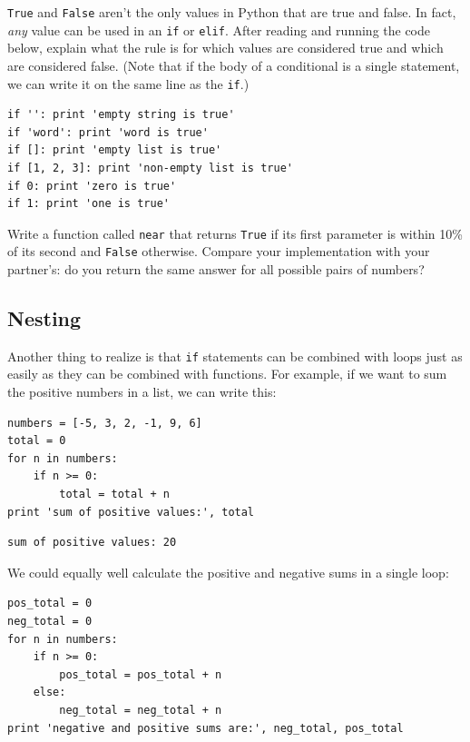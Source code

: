 \documentclass{book}
\begin{document}
\begin{swcenumerate}
\item
  \texttt{True} and \texttt{False} aren't the only values in Python that
  are true and false. In fact, \emph{any} value can be used in an
  \texttt{if} or \texttt{elif}. After reading and running the code
  below, explain what the rule is for which values are considered true
  and which are considered false. (Note that if the body of a
  conditional is a single statement, we can write it on the same line as
  the \texttt{if}.)

\begin{verbatim}
if '': print 'empty string is true'
if 'word': print 'word is true'
if []: print 'empty list is true'
if [1, 2, 3]: print 'non-empty list is true'
if 0: print 'zero is true'
if 1: print 'one is true'
\end{verbatim}
\item
  Write a function called \texttt{near} that returns \texttt{True} if
  its first parameter is within 10\% of its second and \texttt{False}
  otherwise. Compare your implementation with your partner's: do you
  return the same answer for all possible pairs of numbers?
\end{swcenumerate}

\subsection{Nesting}

Another thing to realize is that \texttt{if} statements can be combined
with loops just as easily as they can be combined with functions. For
example, if we want to sum the positive numbers in a list, we can write
this:

\begin{verbatim}
numbers = [-5, 3, 2, -1, 9, 6]
total = 0
for n in numbers:
    if n >= 0:
        total = total + n
print 'sum of positive values:', total
\end{verbatim}

\begin{verbatim}
sum of positive values: 20
\end{verbatim}

We could equally well calculate the positive and negative sums in a
single loop:

\begin{verbatim}
pos_total = 0
neg_total = 0
for n in numbers:
    if n >= 0:
        pos_total = pos_total + n
    else:
        neg_total = neg_total + n
print 'negative and positive sums are:', neg_total, pos_total
\end{verbatim}
\end{document}
